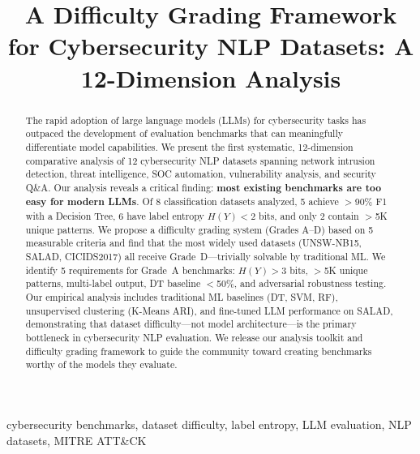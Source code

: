 \documentclass[journal]{IEEEtran}
\begin{document}
\title{A Difficulty Grading Framework for Cybersecurity NLP Datasets: A 12-Dimension Analysis}

\author{
}

\maketitle

\begin{abstract}
The rapid adoption of large language models (LLMs) for cybersecurity tasks has outpaced the development of evaluation benchmarks that can meaningfully differentiate model capabilities. We present the first systematic, 12-dimension comparative analysis of 12 cybersecurity NLP datasets spanning network intrusion detection, threat intelligence, SOC automation, vulnerability analysis, and security Q\&A. Our analysis reveals a critical finding: \textbf{most existing benchmarks are too easy for modern LLMs}. Of 8 classification datasets analyzed, 5 achieve $>$90\% F1 with a Decision Tree, 6 have label entropy $H(Y) < 2$ bits, and only 2 contain $>$5K unique patterns. We propose a difficulty grading system (Grades A--D) based on 5 measurable criteria and find that the most widely used datasets (UNSW-NB15, SALAD, CICIDS2017) all receive Grade~D---trivially solvable by traditional ML. We identify 5 requirements for Grade~A benchmarks: $H(Y) > 3$ bits, $>$5K unique patterns, multi-label output, DT baseline $<$50\%, and adversarial robustness testing. Our empirical analysis includes traditional ML baselines (DT, SVM, RF), unsupervised clustering (K-Means ARI), and fine-tuned LLM performance on SALAD, demonstrating that dataset difficulty---not model architecture---is the primary bottleneck in cybersecurity NLP evaluation. We release our analysis toolkit and difficulty grading framework to guide the community toward creating benchmarks worthy of the models they evaluate.
\end{abstract}

\begin{IEEEkeywords}
cybersecurity benchmarks, dataset difficulty, label entropy, LLM evaluation, NLP datasets, MITRE ATT\&CK
\end{IEEEkeywords}
\end{document}
